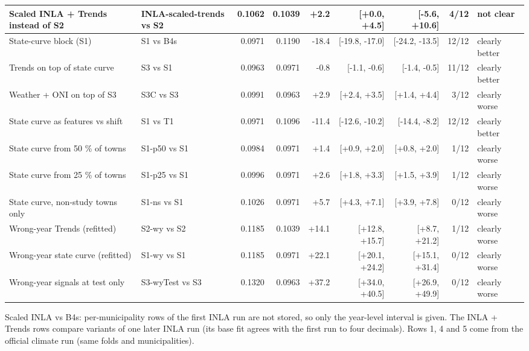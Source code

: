 \begin{table}[t]
{\begin{tabular}{llrrrrrrl}
Scaled INLA + Trends instead of S2 & INLA-scaled-trends vs S2 & 0.1062 & 0.1039 & +2.2 & [+0.0, +4.5] & [-5.6, +10.6] & 4/12 & not clear \\
\midrule
State-curve block (S1) & S1 vs B4s & 0.0971 & 0.1190 & -18.4 & [-19.8, -17.0] & [-24.2, -13.5] & 12/12 & clearly better \\
Trends on top of state curve & S3 vs S1 & 0.0963 & 0.0971 & -0.8 & [-1.1, -0.6] & [-1.4, -0.5] & 11/12 & clearly better \\
Weather + ONI on top of S3 & S3C vs S3 & 0.0991 & 0.0963 & +2.9 & [+2.4, +3.5] & [+1.4, +4.4] & 3/12 & clearly worse \\
State curve as features vs shift & S1 vs T1 & 0.0971 & 0.1096 & -11.4 & [-12.6, -10.2] & [-14.4, -8.2] & 12/12 & clearly better \\
\midrule
State curve from 50 \% of towns & S1-p50 vs S1 & 0.0984 & 0.0971 & +1.4 & [+0.9, +2.0] & [+0.8, +2.0] & 1/12 & clearly worse \\
State curve from 25 \% of towns & S1-p25 vs S1 & 0.0996 & 0.0971 & +2.6 & [+1.8, +3.3] & [+1.5, +3.9] & 1/12 & clearly worse \\
State curve, non-study towns only & S1-ns vs S1 & 0.1026 & 0.0971 & +5.7 & [+4.3, +7.1] & [+3.9, +7.8] & 0/12 & clearly worse \\
\midrule
Wrong-year Trends (refitted) & S2-wy vs S2 & 0.1185 & 0.1039 & +14.1 & [+12.8, +15.7] & [+8.7, +21.2] & 1/12 & clearly worse \\
Wrong-year state curve (refitted) & S1-wy vs S1 & 0.1185 & 0.0971 & +22.1 & [+20.1, +24.2] & [+15.1, +31.4] & 0/12 & clearly worse \\
Wrong-year signals at test only & S3-wyTest vs S3 & 0.1320 & 0.0963 & +37.2 & [+34.0, +40.5] & [+26.9, +49.9] & 0/12 & clearly worse \\
\bottomrule
\end{tabular}}
\par\vspace{2pt}\footnotesize Scaled INLA vs B4s: per-municipality rows of the first INLA run are not stored, so only the year-level interval is given. The INLA + Trends rows compare variants of one later INLA run (its base fit agrees with the first run to four decimals). Rows 1, 4 and 5 come from the official climate run (same folds and municipalities).
\end{table}
